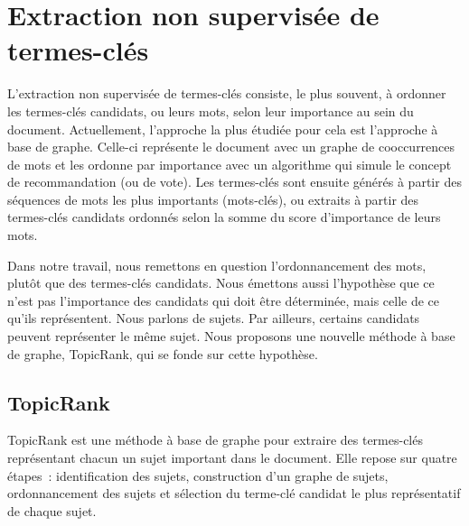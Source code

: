   \section{Extraction non supervisée de termes-clés}
  \label{sec:main:domain_independent_keyphrase_extraction-unsupervised_automatic_keyphrase_extraction}
    L'extraction non supervisée de termes-clés consiste, le plus souvent, à
    ordonner les termes-clés candidats, ou leurs mots, selon leur importance au
    sein du document. Actuellement, l'approche la plus étudiée pour cela est
    l'approche à base de graphe. Celle-ci représente le document avec un graphe
    de cooccurrences de mots et les ordonne par importance avec un algorithme
    qui simule le concept de recommandation (ou de vote). Les termes-clés sont
    ensuite générés à partir des séquences de mots les plus importants
    (mots-clés), ou extraits à partir des termes-clés candidats ordonnés selon
    la somme du score d'importance de leurs mots.

    Dans notre travail, nous remettons en question l'ordonnancement des mots,
    plutôt que des termes-clés candidats. Nous émettons
    aussi l'hypothèse que ce n'est pas l'importance des candidats qui doit être
    déterminée, mais celle de ce qu'ils représentent. Nous parlons de sujets.
    Par ailleurs, certains candidats peuvent représenter le même sujet. Nous
    proposons une nouvelle méthode à base de graphe, TopicRank, qui se fonde sur
    cette hypothèse.

    \subsection{TopicRank}
    \label{subsec:main:domain_independent_keyphrase_extraction-unsupervised_automatic_keyphrase_extraction-topicrank}
      TopicRank est une méthode à base de graphe pour extraire des termes-clés
      représentant chacun un sujet important dans le document.
      Elle repose sur quatre étapes~: identification des sujets, construction
      d'un graphe de sujets, ordonnancement des sujets et sélection du terme-clé
      candidat le plus représentatif de chaque sujet.

